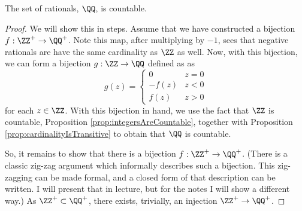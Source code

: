 \guard




\begin{prop}
\label{prop:rationalsAreCountable}
  The set of rationals, $\QQ$, is countable.
\end{prop}
\begin{proof}
  We will show this in steps.
  Assume that we have constructed a bijection $f:\ZZ^+\to \QQ^+$.
  Note this map, after multiplying by $-1$, sees that negative rationals are have the same cardinality as $\ZZ$ as well.
  Now, with this bijection, we can form a bijection $g:\ZZ\to\QQ$ defined as as \[ g(z) = \begin{cases}
      0 & z= 0 \\
      -f(z) & z<0 \\
      f(z) & z>0
   \end{cases} \]
   for each $z\in\ZZ$.
   With this bijection in hand, we use the fact that $\ZZ$ is countable, Proposition \ref{prop:integersAreCountable}, together with Proposition \ref{prop:cardinalityIsTransitive} to obtain that $\QQ$ is countable.

   So, it remains to show that there is a bijection $f:\ZZ^+\to\QQ^+$.
   (There is a classic zig-zag argument which informally describes such a bijection. This zig-zagging can be made formal, and a closed form of that description can be written. I will present that in lecture, but for the notes I will show a different way.)
   As $\ZZ^+\subset \QQ^+$, there exists, trivially, an injection $\ZZ^+\to\QQ^+$.
\end{proof}
